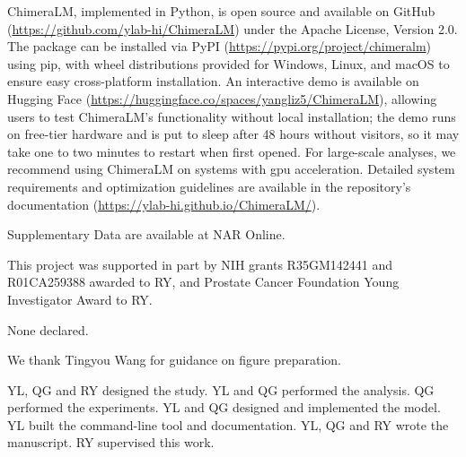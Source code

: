 \documentclass[pdflatex,lineno]{sn-jnl}%
\newif\ifrevisedtext
\newcommand{\chg}[1]{\ifrevisedtext\textcolor{revcolor}{#1}\else#1\fi}
\begin{document}
ChimeraLM, implemented in Python, is open source and available on GitHub (\url{https://github.com/ylab-hi/ChimeraLM}) under the Apache License, Version 2.0.
The package can be installed via PyPI (\url{https://pypi.org/project/chimeralm}) using pip, with wheel distributions provided for Windows, Linux, and macOS to ensure easy cross-platform installation.
An interactive demo is available on Hugging Face (\url{https://huggingface.co/spaces/yangliz5/ChimeraLM}), allowing users to test ChimeraLM's functionality without local installation\chg{; the demo runs on free-tier hardware and is put to sleep after 48 hours without visitors, so it may take one to two minutes to restart when first opened}.
For large-scale analyses, we recommend using ChimeraLM on systems with \gls{gpu} acceleration. Detailed system requirements and optimization guidelines are available in the repository's documentation (\url{https://ylab-hi.github.io/ChimeraLM/}).


Supplementary Data are available at NAR Online.


This project was supported in part by NIH grants R35GM142441 and R01CA259388 awarded to RY, and Prostate Cancer Foundation Young Investigator Award to RY.


None declared.


We thank Tingyou Wang for guidance on figure preparation.


YL, QG and RY designed the study.
YL and QG performed the analysis.
QG performed the experiments.
YL and QG designed and implemented the model.
YL built the command-line tool and documentation.
YL, QG and RY wrote the manuscript.
RY supervised this work.

\end{document}
